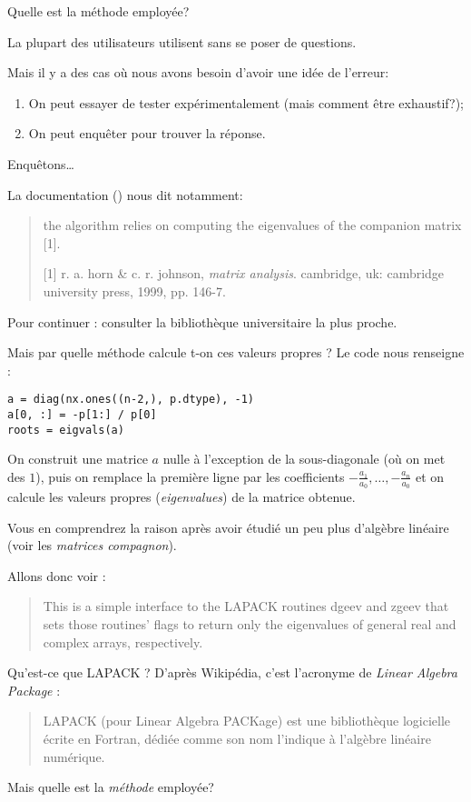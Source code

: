 Quelle est la méthode employée?

La plupart des utilisateurs utilisent  sans se
poser de questions.

Mais il y a des cas où nous avons besoin d'avoir une idée de l'erreur:
\begin{enumerate}
\item On peut essayer de tester expérimentalement (mais comment être
  exhaustif?);
\item On peut enquêter pour trouver la réponse.
\end{enumerate}

Enquêtons\ldots{}

La documentation () nous dit notamment:
\begin{quote}
the algorithm relies on computing the eigenvalues of the
companion matrix [1].

[1] r. a. horn \& c. r. johnson, \emph{matrix analysis}.  cambridge, uk:
    cambridge university press, 1999, pp. 146-7.
\end{quote}
Pour continuer : consulter la bibliothèque universitaire la plus proche.
\medskip

Mais par quelle méthode calcule t-on ces valeurs propres ?
Le code nous renseigne :
\begin{lstlisting}
a = diag(nx.ones((n-2,), p.dtype), -1)
a[0, :] = -p[1:] / p[0]
roots = eigvals(a)
\end{lstlisting}
On construit une matrice $a$ nulle à l'exception de la sous-diagonale
(où on met des $1$), puis on remplace la première ligne par les
coefficients $-\frac{a_{1}}{a_{0}}, \ldots, -\frac{a_{n}}{a_{0}}$ et
on calcule les valeurs propres (\textit{eigenvalues}) de la matrice
obtenue.

Vous en comprendrez la raison après avoir étudié un peu plus d'algèbre linéaire (voir les \emph{matrices compagnon}).

\medskip

Allons donc voir  :
\begin{quote}
This is a simple interface to the LAPACK routines dgeev and zgeev
that sets those routines' flags to return only the eigenvalues of
general real and complex arrays, respectively.
\end{quote}

Qu'est-ce que LAPACK ? D'après Wikipédia, c'est l'acronyme de \emph{Linear Algebra Package} : 
\begin{quote}
LAPACK (pour Linear Algebra PACKage) est une bibliothèque logicielle
écrite en Fortran, dédiée comme son nom l'indique à l'algèbre linéaire
numérique.
\end{quote}
Mais quelle est la \emph{méthode} employée?

